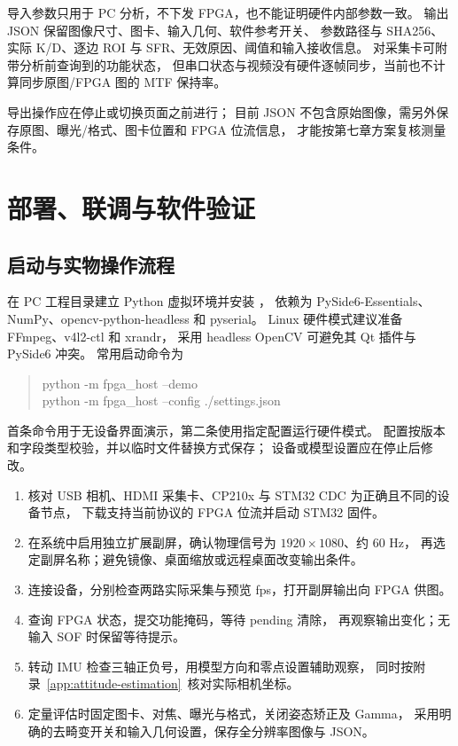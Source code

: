 导入参数只用于 PC 分析，不下发 FPGA，也不能证明硬件内部参数一致。
输出 JSON 保留图像尺寸、图卡、输入几何、软件参考开关、
参数路径与 SHA256、实际 K/D、逐边 ROI 与 SFR、无效原因、阈值和输入接收信息。
对采集卡可附带分析前查询到的功能状态，
但串口状态与视频没有硬件逐帧同步，当前也不计算同步原图/FPGA 图的 MTF 保持率。

导出操作应在停止或切换页面之前进行；
目前 JSON 不包含原始图像，需另外保存原图、曝光/格式、图卡位置和 FPGA 位流信息，
才能按第七章方案复核测量条件。

\section{部署、联调与软件验证}
\subsection{启动与实物操作流程}
在 PC 工程目录建立 Python 虚拟环境并安装 ，
依赖为 PySide6-Essentials、NumPy、opencv-python-headless 和 pyserial。
Linux 硬件模式建议准备 FFmpeg、v4l2-ctl 和 xrandr，
采用 headless OpenCV 可避免其 Qt 插件与 PySide6 冲突。
常用启动命令为
\begin{quote}\small\ttfamily
python -m fpga\_host --demo\\
python -m fpga\_host --config ./settings.json
\end{quote}
首条命令用于无设备界面演示，第二条使用指定配置运行硬件模式。
配置按版本和字段类型校验，并以临时文件替换方式保存；
设备或模型设置应在停止后修改。

\begin{enumerate}
\item 核对 USB 相机、HDMI 采集卡、CP210x 与 STM32 CDC 为正确且不同的设备节点，
下载支持当前协议的 FPGA 位流并启动 STM32 固件。
\item 在系统中启用独立扩展副屏，确认物理信号为 $1920\times1080$、约 60 Hz，
再选定副屏名称；避免镜像、桌面缩放或远程桌面改变输出条件。
\item 连接设备，分别检查两路实际采集与预览 fps，打开副屏输出向 FPGA 供图。
\item 查询 FPGA 状态，提交功能掩码，等待 pending 清除，
再观察输出变化；无输入 SOF 时保留等待提示。
\item 转动 IMU 检查三轴正负号，用模型方向和零点设置辅助观察，
同时按附录~\ref{app:attitude-estimation}~核对实际相机坐标。
\item 定量评估时固定图卡、对焦、曝光与格式，关闭姿态矫正及 Gamma，
采用明确的去畸变开关和输入几何设置，保存全分辨率图像与 JSON。
\end{enumerate}

